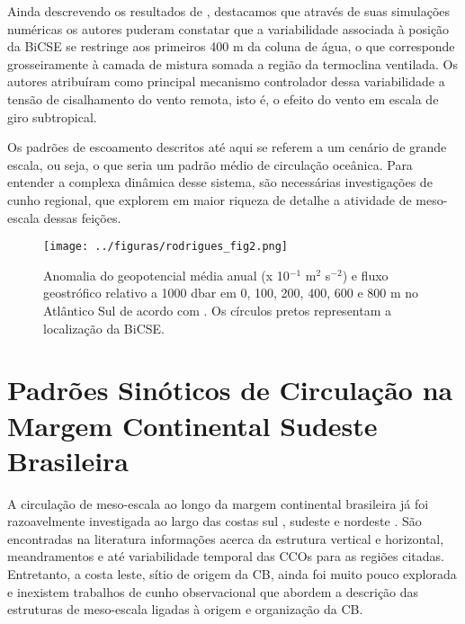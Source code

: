 Ainda descrevendo os resultados de \cite{rodrigues_etal2006}, destacamos que
através de suas simulações numéricas os autores puderam constatar que a variabilidade associada à posição da BiCSE se restringe aos 
primeiros 400 m da coluna de água, o que corresponde grosseiramente à camada de mistura somada a região da termoclina
ventilada. Os autores atribuíram como principal mecanismo controlador dessa variabilidade a tensão de cisalhamento do vento remota, 
isto é, o efeito do vento em escala de giro subtropical. 


Os padrões de escoamento descritos até aqui se referem a um cenário de 
grande escala, ou seja, o que seria um padrão médio de circulação oceânica. Para entender a complexa dinâmica desse sistema, 
são necessárias investigações de cunho regional, que explorem em maior riqueza
de detalhe a atividade de meso-escala dessas feições.

\begin{figure}%
 \begin{center}
  \texttt{[image: ../figuras/rodrigues\_fig2.png]}
 \end{center}
 \vspace{-.5cm}
 \renewcommand{\baselinestretch}{1}
 \caption{\label{fig:rodrigues} \small Anomalia do geopotencial média anual (x 10$^{-1}$ m$^2$ s$^{-2}$) e fluxo 
geostrófico relativo a 1000 dbar em 0, 100, 200, 400, 600 e 800 m no Atlântico Sul de acordo com \cite{rodrigues_etal2006}. Os círculos pretos representam a localização da Bi\-CSE.}
\end{figure}

\newpage

\section{Padrões Sinóticos de Circulação na Margem Continental Sudeste Brasileira}\label{sec:mesoesc}

\hspace{6mm} A circulação de meso-escala ao longo da margem continental brasileira já foi razoavelmente
investigada ao largo das costas sul \citep{olson_etal1988}, sudeste \citep{silveira_etal2000A} e nordeste 
\citep{silveira_etal2000B}. São encontradas
na literatura informações acerca da estrutura vertical e horizontal, 
meandramentos e até variabilidade temporal das CCOs para as regiões citadas.
Entretanto, a costa leste, sítio de origem da CB, ainda foi muito pouco
explorada e inexistem trabalhos de cunho observacional que abordem a descrição das estruturas de
 meso-escala ligadas à origem e organização da CB.  

